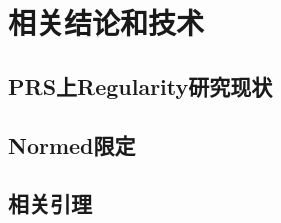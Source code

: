 
\chapter{相关结论和技术}
\label{chap:relat}

\section{PRS上Regularity研究现状}
\label{sec:prs-reg-result}

\section{Normed限定}
\label{sec:norm}

\section{相关引理}
\label{sec:lemma}
